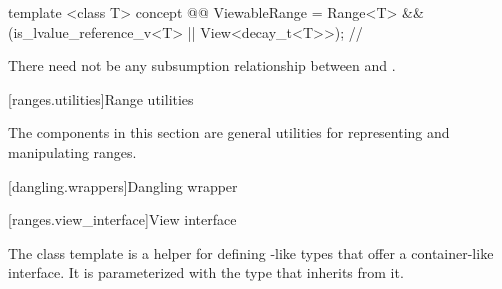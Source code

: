 \begin{codeblock}
template <class T>
concept @@ ViewableRange =
  Range<T> && (is_lvalue_reference_v<T> || View<decay_t<T>>); // \seebelow
\end{codeblock}

\pnum
There need not be any subsumption relationship between 
and .


[ranges.utilities]{Range utilities}

\pnum
The components in this section are general utilities for representing and
manipulating ranges.

[dangling.wrappers]{Dangling wrapper}


[ranges.view_interface]{View interface}

\pnum
The class template  is a helper for defining -like types that offer a
container-like interface. It is parameterized with the type that inherits from it.

